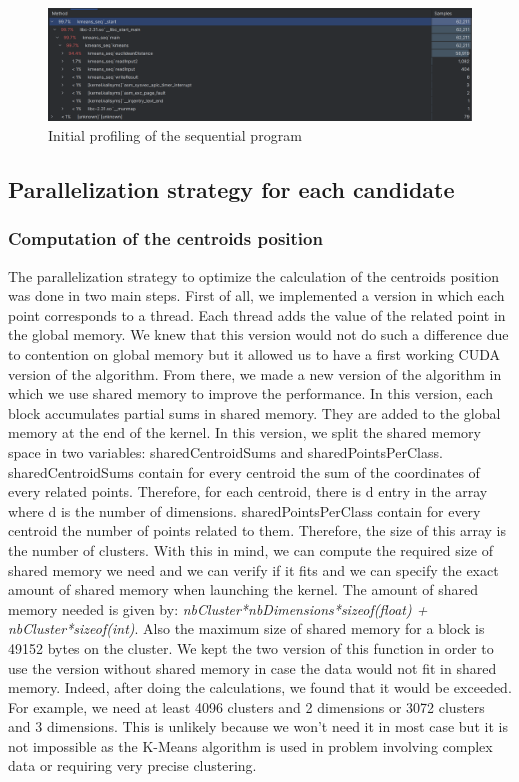 \documentclass[sigconf]{acmart}
\begin{document}
\begin{figure}[h!]
    \centering
    \includegraphics[width=\columnwidth]{initial_profiling.png}
    \caption{Initial profiling of the sequential program}
    \label{fig:initial_profiling}
\end{figure}

\subsection{Parallelization strategy for each candidate}

\subsubsection{Computation of the centroids position}
The parallelization strategy to optimize the calculation of the centroids position was done in two main steps.
First of all, we implemented a version in which each point corresponds to a thread. Each thread adds the value of the related point in the global memory. We knew that this version would not do such a difference due to contention on global memory but it allowed us to have a first working CUDA version of the algorithm.
From there, we made a new version of the algorithm in which we use shared memory to improve the performance. In this version, each block accumulates partial sums in shared memory. They are added to the global memory at the end of the kernel.
In this version, we split the shared memory space in two variables: sharedCentroidSums and sharedPointsPerClass. sharedCentroidSums contain for every centroid the sum of the coordinates of every related points. Therefore, for each centroid, there is d entry in the array where d is the number of dimensions.
sharedPointsPerClass contain for every centroid the number of points related to them. Therefore, the size of this array is the number of clusters.
With this in mind, we can compute the required size of shared memory we need and we can verify if it fits and we can specify the exact amount of shared memory when launching the kernel.
The amount of shared memory needed is given by: \emph{nbCluster*nbDimensions*sizeof(float) + nbCluster*sizeof(int)}.
Also the maximum size of shared memory for a block is 49152 bytes on the cluster.
We kept the two version of this function in order to use the version without shared memory in case the data would not fit in shared memory.
Indeed, after doing the calculations, we found that it would be exceeded. For example, we need at least 4096 clusters and 2 dimensions or 3072 clusters and 3 dimensions. This is unlikely because we won't need it in most case but it is not impossible as the K-Means algorithm is used in problem involving complex data or requiring very precise clustering.
\end{document}
